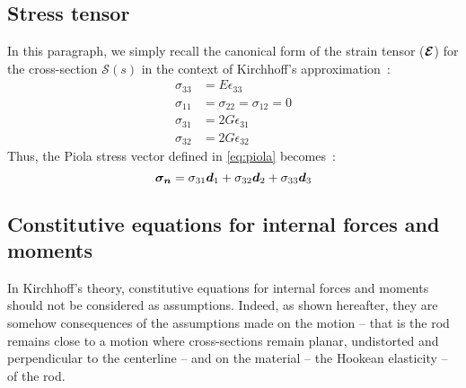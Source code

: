 \subsection{Stress tensor}
In this paragraph, we simply recall the canonical form of the strain tensor ($\boldsymbol{\mathcal{E}}$) for the cross-section $\mathcal{S}(s)$ in the context of Kirchhoff's approximation~: 
\begin{subequations}
	\begin{alignat}{1}
	\sigma_{33} &= E \epsilon_{33} \label{eq:stress_a}
	\\
	\sigma_{11} &=  \sigma_{22} = \sigma_{12} = 0 \label{eq:stress_b}
	\\
	\sigma_{31} &= 2G \epsilon_{31}	\label{eq:stress_c}
	\\
	\sigma_{32} &= 2G \epsilon_{32}	\label{eq:stress_d}
	\end{alignat}
\end{subequations}
Thus, the Piola stress vector defined in \cref{eq:piola} becomes~:
\begin{equation}
	\boldsymbol{\sigma_n} = \sigma_{31}\boldsymbol{d}_1 + \sigma_{32}\boldsymbol{d}_2 + \sigma_{33}\boldsymbol{d}_3 \label{eq:piola2}
\end{equation}

\subsection{Constitutive equations for internal forces and moments}
In Kirchhoff's theory, constitutive equations for internal forces and moments should not be considered as assumptions. Indeed, as shown hereafter, they are somehow consequences of the assumptions made on the motion -- that is the rod remains close to a motion where cross-sections remain planar, undistorted and perpendicular to the centerline -- and on the material -- the Hookean elasticity -- of the rod.

